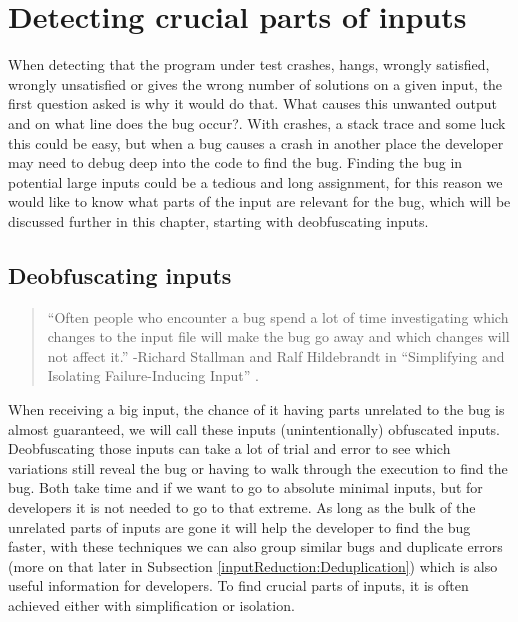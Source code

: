 \chapter{Detecting crucial parts of inputs}
\label{cha:4:crucialParts}
\label{inputReduction:intro}
When detecting that the program under test crashes, hangs, wrongly satisfied, wrongly unsatisfied or gives the wrong number of solutions on a given input, the first question asked is why it would do that. What causes this unwanted output and on what line does the bug occur?. 
With crashes, a stack trace and some luck this could be easy, but when a bug causes a crash in another place the developer may need to debug deep into the code to find the bug. 
Finding the bug in potential large inputs could be a tedious and long assignment, for this reason we would like to know what parts of the input are relevant for the bug, which will be discussed further in this chapter, starting with deobfuscating inputs.


\section{Deobfuscating inputs}
\label{inputReduction:Deobfuscating}
\begin{quote}
	“Often people who encounter a bug spend a lot of time investigating which changes to the input file will make the bug go away and which changes will not affect it.” 
	\newline
	-Richard Stallman and Ralf Hildebrandt in “Simplifying and Isolating Failure-Inducing Input” \cite{5zeller2002simplifyingIsolatingFailure-inducing}.
\end{quote} 
When receiving a big input, the chance of it having parts unrelated to the bug is almost guaranteed, we will call these inputs (unintentionally) obfuscated inputs. Deobfuscating those inputs can take a lot of trial and error to see which variations still reveal the bug or having to walk through the execution to find the bug. Both take time and if we want to go to absolute minimal inputs, but for developers it is not needed to go to that extreme. As long as the bulk of the unrelated parts of inputs are gone it will help the developer to find the bug faster, with these techniques we can also group similar bugs and duplicate errors (more on that later in Subsection \ref{inputReduction:Deduplication}) which is also useful information for developers. To find crucial parts of inputs, it is often achieved either with simplification or isolation. 

